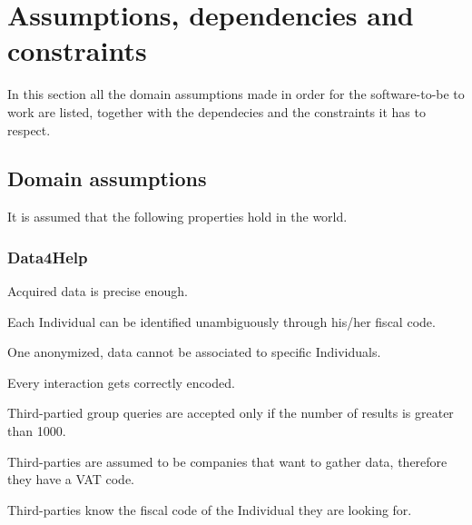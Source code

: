 \section{Assumptions, dependencies and constraints}
    In this section all the domain assumptions made in order for the software-to-be to work are listed, together with the dependecies and the constraints it has to respect.
    
    \subsection{Domain assumptions}
        It is assumed that the following properties hold in the world.
        
        \subsubsection{Data4Help}
        \begin{enumerate}[label={[}D1.\arabic*{]}]
            \item Acquired data is precise enough.
            
            \item Each Individual can be identified unambiguously through his/her fiscal code.
            
            \item One anonymized, data cannot be associated to specific Individuals.
            
            \item Every interaction gets correctly encoded.
            
            \item Third-partied group queries are accepted only if the number of results is greater than 1000.
            
            \item Third-parties are assumed to be companies that want to gather data, therefore they have a VAT code.
            
            \item Third-parties know the fiscal code of the Individual they are looking for.
        \end{enumerate}
        
